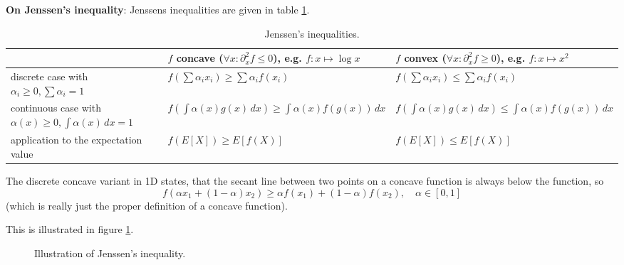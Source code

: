 
\textbf{On Jenssen's inequality}: Jenssens inequalities are given in 
table \ref{tab:jenssen}.

\begin{table}[!htb]
    \centering
    \begin{tabular}{|p{}||p{}|p{}|}
        \hline
        & \textcolor{blue1}{$f$ concave} ($\forall x: \partial_x^2 f \leq 0$), e.g. $f:x\mapsto \log x$ & \textcolor{blue1}{$f$ convex} ($\forall x: \partial_x^2 f \geq 0$), e.g. $f:x\mapsto x^2$  \\
        \hline
        discrete case with $\alpha_i \geq 0, \sum \alpha_i = 1$ & $f(\sum \alpha_i x_i) \geq \sum \alpha_i f(x_i)$ & $f(\sum \alpha_i x_i) \leq \sum \alpha_i f(x_i)$ \\
        \hline
        continuous case with $\alpha(x) \geq 0, \int \alpha(x) \, dx = 1$ & $f(\int \alpha(x) g(x) \, dx) \geq \int \alpha(x) f(g(x)) \, dx$ & $f(\int \alpha(x) g(x) \, dx) \leq \int \alpha(x) f(g(x)) \, dx$ \\
        \hline
        application to the expectation value & $f(E[X]) \geq E[f(X)]$ & $f(E[X]) \leq E[f(X)]$ \\
        \hline
    \end{tabular}
    \caption{Jenssen's inequalities.}
    \label{tab:jenssen}
\end{table}

The discrete concave variant in 1D states, that the secant line between two points on a concave function is always below the function, so
\begin{equation}
    f(\alpha x_1 + (1-\alpha) x_2) \geq \alpha f(x_1) + (1-\alpha) f(x_2), \quad \alpha \in [0,1]
\end{equation}
(which is really just the proper definition of a concave function).

This is illustrated in figure \ref{fig:jenssen}.

\begin{figure}[H]
    \centering
    
    \caption{Illustration of Jenssen's inequality.}
    \label{fig:jenssen}
\end{figure}


